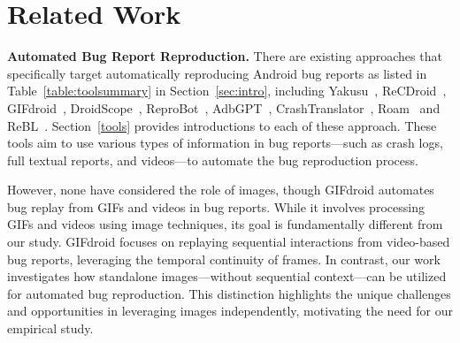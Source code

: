 

\section{Related Work}

\noindent\textbf{Automated Bug Report Reproduction.}
There are existing approaches that specifically target automatically reproducing Android bug reports as listed in Table~\ref{table:toolsummary} in Section~\ref{sec:intro},
including Yakusu~\cite{fazzini2018automatically},  ReCDroid~\cite{zhao2019recdroid},  GIFdroid~\cite{feng2022gifdroid}, DroidScope~\cite{huang2023context},  ReproBot~\cite{zhang2023automatically}, AdbGPT~\cite{feng2024prompting}, CrashTranslator~\cite{huang2024crashtranslator}, Roam~\cite{zhang2024mobile} and ReBL~\cite{wang2024feedback}.  Section~\ref{tools} provides introductions to each of these approach.
These tools aim to use various types of information in bug reports—such as crash logs, full textual reports, and videos—to automate the bug reproduction process. 

However, none have considered the role of images, though GIFdroid automates bug replay from GIFs and videos in bug reports. While it involves processing GIFs and videos using image techniques, its goal is fundamentally different from our study. GIFdroid focuses on replaying sequential interactions from video-based bug reports, leveraging the temporal continuity of frames. In contrast, our work investigates how standalone images—without sequential context—can be utilized for automated bug reproduction. This distinction highlights the unique challenges and opportunities in leveraging images independently, motivating the need for our empirical study.



